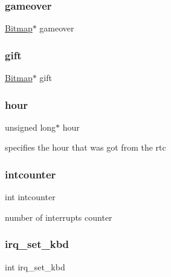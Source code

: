 \subsubsection{\texorpdfstring{gameover}{gameover}}
{\footnotesize\ttfamily \hyperlink{struct_bitmap}{Bitmap}$\ast$ gameover}

\mbox{\label{struct_game_a78e9340cc0b28cd18c981daa6cb4bbcf}} 
\subsubsection{\texorpdfstring{gift}{gift}}
{\footnotesize\ttfamily \hyperlink{struct_bitmap}{Bitmap}$\ast$ gift}

\mbox{\label{struct_game_a8e1dd8c104588f46888076276ca85156}} 
\subsubsection{\texorpdfstring{hour}{hour}}
{\footnotesize\ttfamily unsigned long$\ast$ hour}



specifies the hour that was got from the rtc 

\mbox{\label{struct_game_aa5694ae37c0e6ed93d4875a167dfde0b}} 
\subsubsection{\texorpdfstring{intcounter}{intcounter}}
{\footnotesize\ttfamily int intcounter}



number of interrupts counter 

\mbox{\label{struct_game_a492428101cf654ca73d0b290d6dc7dfc}} 
\subsubsection{\texorpdfstring{irq\+\_\+set\+\_\+kbd}{irq\_set\_kbd}}
{\footnotesize\ttfamily int irq\+\_\+set\+\_\+kbd}



